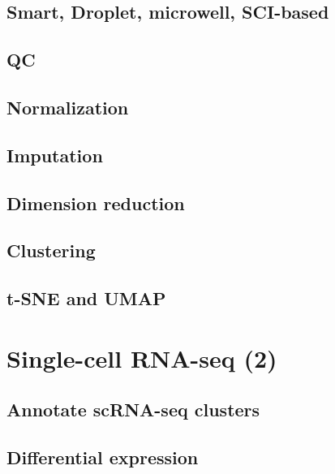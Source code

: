 \documentclass[
]{book}
\begin{document}
\hypertarget{smart-droplet-microwell-sci-based}{%
\section{Smart, Droplet, microwell, SCI-based}\label{smart-droplet-microwell-sci-based}}

\hypertarget{qc}{%
\section{QC}\label{qc}}

\hypertarget{normalization}{%
\section{Normalization}\label{normalization}}

\hypertarget{imputation}{%
\section{Imputation}\label{imputation}}

\hypertarget{dimension-reduction}{%
\section{Dimension reduction}\label{dimension-reduction}}

\hypertarget{clustering}{%
\section{Clustering}\label{clustering}}

\hypertarget{t-sne-and-umap}{%
\section{t-SNE and UMAP}\label{t-sne-and-umap}}

\hypertarget{scrna2}{%
\chapter{Single-cell RNA-seq (2)}\label{scrna2}}

\hypertarget{annotate-scrna-seq-clusters}{%
\section{Annotate scRNA-seq clusters}\label{annotate-scrna-seq-clusters}}

\hypertarget{differential-expression}{%
\section{Differential expression}\label{differential-expression}}
\end{document}
